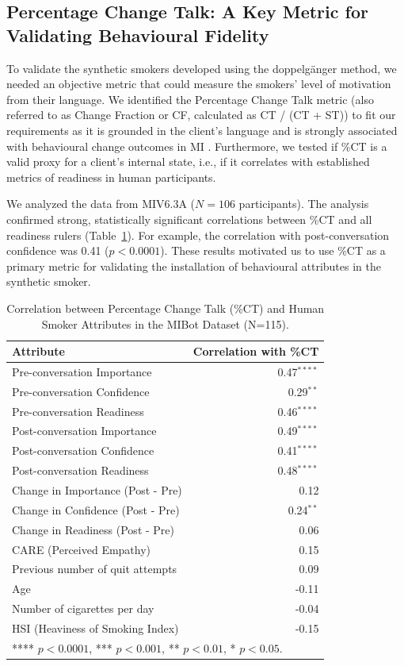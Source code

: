 \subsection{Percentage Change Talk: A Key Metric for Validating Behavioural Fidelity}

To validate the synthetic smokers developed using the doppelgänger method, we needed an objective metric that could measure the smokers' level of motivation from their language.
We identified the Percentage Change Talk metric (also referred to as Change Fraction or CF, calculated as CT / (CT + ST)) to fit our requirements as it is grounded in the client's language and is strongly associated with behavioural change outcomes in MI \cite{Barnett2014,Houck2018,Moyers2009,Baer2008}.
Furthermore, we tested if \%CT is a valid proxy for a client's internal state, i.e., if it correlates with established metrics of readiness in human participants.

We analyzed the data from MIV6.3A ($N=106$ participants). The analysis confirmed strong, statistically significant correlations between \%CT and all readiness rulers (Table~\ref{tab:ct-correlation}). For example, the correlation with post-conversation confidence was 0.41 ($p < 0.0001$). These results motivated us to use \%CT as a primary metric for validating the installation of behavioural attributes in the synthetic smoker.


\begin{table}[!ht]
\centering
\begin{tabular}{@{}lr@{}}
\toprule
\textbf{Attribute} & \textbf{Correlation with \%CT} \\
\midrule
Pre-conversation Importance & 0.47$^{****}$ \\
Pre-conversation Confidence & 0.29$^{**}$ \\
Pre-conversation Readiness & 0.46$^{****}$ \\
\midrule
Post-conversation Importance & 0.49$^{****}$ \\
Post-conversation Confidence & 0.41$^{****}$ \\
Post-conversation Readiness & 0.48$^{****}$ \\
\midrule
Change in Importance (Post - Pre) & 0.12 \\
Change in Confidence (Post - Pre) & 0.24$^{**}$ \\
Change in Readiness (Post - Pre) & 0.06 \\
\midrule
CARE (Perceived Empathy) & 0.15 \\
Previous number of quit attempts & 0.09 \\
Age & -0.11 \\
Number of cigarettes per day & -0.04 \\
HSI (Heaviness of Smoking Index) & -0.15 \\
\bottomrule
\multicolumn{2}{l}{\footnotesize{**** $p < 0.0001$, *** $p < 0.001$, ** $p < 0.01$, * $p < 0.05$}.}
\end{tabular}
\caption{Correlation between Percentage Change Talk (\%CT) and Human Smoker Attributes in the MIBot Dataset (N=115).}
\label{tab:ct-correlation}
\end{table}



